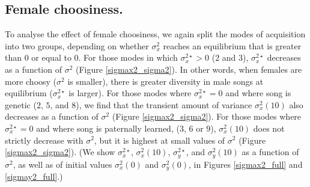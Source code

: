 \documentclass{article}
\begin{document}
\subsection*{Female choosiness. }
To analyse the effect of female choosiness, we again split the modes of acquisition into two groups, depending on whether $\sigma_x^2$ reaches an equilibrium that is greater than $0$ or equal to $0$. For those modes in which $\sigma_x^{2\star}>0$ ($2$ and $3$), $\sigma_x^{2\star}$ decreases as a function of $\sigma^2$ (Figure \ref{sigmax2_sigma2}). In other words, when females are more choosy ($\sigma^2$ is smaller), there is greater diversity in male songs at equilibrium ($\sigma_x^{2\star}$ is larger). For those modes where $\sigma_x^{2\star}=0$ and where song is genetic ($2$, $5$, and $8$), we find that the transient amount of variance $\sigma_x^2(10)$ also decreases as a function of $\sigma^2$ (Figure \ref{sigmax2_sigma2}). For those modes where $\sigma_x^{2\star}=0$ and where song is paternally learned, ($3$, $6$ or $9$), $\sigma_x^2(10)$ does not strictly decrease with $\sigma^2$, but it is highest at small values of $\sigma^2$ (Figure \ref{sigmax2_sigma2}).  (We show $\sigma_x^{2\star}$, $\sigma_x^2(10)$, $\sigma_y^{2\star}$, and $\sigma_y^2(10)$ as a function of $\sigma^2$, as well as of initial values $\sigma_x^2(0)$ and $\sigma_y^2(0)$, in Figures \ref{sigmax2_full} and \ref{sigmay2_full}.)
\end{document}
